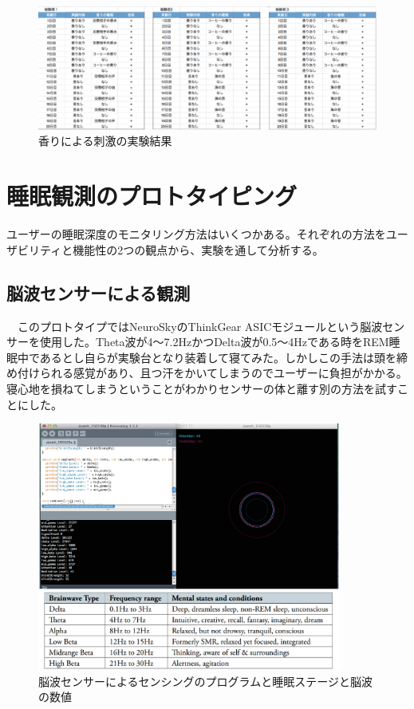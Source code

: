 \begin{figure}[htbp]
\begin{center}
\includegraphics[width=15cm]{eps/smellExperiment.eps}
\caption{香りによる刺激の実験結果}
\label{smellExperiment}
\end{center}
\end{figure}

\section{睡眠観測のプロトタイピング}
ユーザーの睡眠深度のモニタリング方法はいくつかある。それぞれの方法をユーザビリティと機能性の2つの観点から、実験を通して分析する。

\subsection{脳波センサーによる観測}
　このプロトタイプではNeuroSkyのThinkGear ASICモジュールという脳波センサーを使用した。Theta波が4〜7.2HzかつDelta波が0.5〜4Hzである時をREM睡眠中であるとし自らが実験台となり装着して寝てみた。しかしこの手法は頭を締め付けられる感覚があり、且つ汗をかいてしまうのでユーザーに負担がかかる。寝心地を損ねてしまうということがわかりセンサーの体と離す別の方法を試すことにした。
\begin{figure}[htbp]
\begin{center}
\includegraphics[width=10cm]{eps/brainWave.eps}
\caption{脳波センサーによるセンシングのプログラムと睡眠ステージと脳波の数値}
\label{brainWave}
\end{center}
\end{figure}

